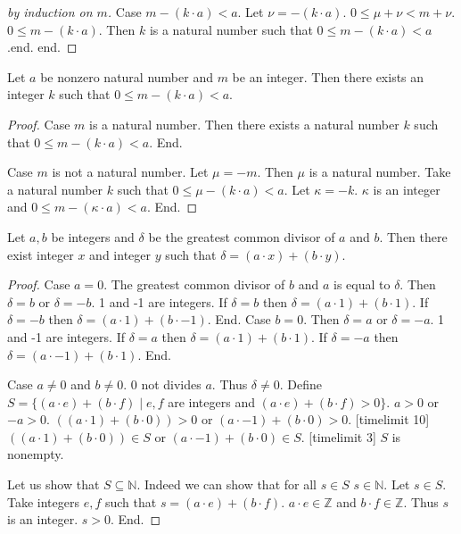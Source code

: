 \documentclass{article}
\begin{document}
\begin{forthel}
\begin{proof}[by induction on $m$]
Case $m - (k \cdot a) < a$. Let $\nu = -(k \cdot a)$.
$0 \leq \mu + \nu < m + \nu$. 
$0 \leq m - (k \cdot a)$.
Then $k$ is a natural number such that
$0 \leq  m - (k \cdot a) < a$.end.
end. 
\end{proof}

\begin{lemma}
Let $a$ be nonzero natural number and $m$ be an integer.
Then there exists an integer $k$ such that $0 \leq m - (k \cdot a) < a$.
\end{lemma}
\begin{proof}
Case $m$ is a natural number. Then there exists a natural number $k$ such that $0 \leq m - (k \cdot a) < a$. End.

Case $m$ is not a natural number. Let $\mu = -m$. Then $\mu$ is a natural number.
Take a natural number $k$ such that $0 \leq \mu - (k \cdot a) < a$. Let $\kappa = -k$. 
$\kappa$ is an integer and $0 \leq m - (\kappa \cdot a) < a$. End.
\end{proof}



\begin{theorem}[Bezout]
Let $a,b$ be integers and $\delta$ be the greatest common divisor of $a$ and $b$.
Then there exist integer $x$ and integer $y$ such that 
$\delta = (a \cdot x) + (b \cdot y)$. 
\end{theorem}
\begin{proof}
Case $a = 0$. The greatest common divisor of $b$ and $a$ is equal to $\delta$.
  Then $\delta = b$ or $\delta = -b$. 1 and -1 are integers. 
  If $\delta = b$ then $\delta = (a \cdot 1) + (b \cdot 1)$. If $\delta = -b$ then $\delta = (a \cdot 1) + (b \cdot -1)$. End. 
Case $b = 0$. Then $\delta = a$ or $\delta = -a$. 1 and -1 are integers. 
  If $\delta = a$ then $\delta = (a \cdot 1) + (b \cdot 1)$. If $\delta = -a$ then $\delta = (a \cdot -1) + (b \cdot 1)$. End. 

Case $a \neq  0$ and $b \neq 0$.
  $0$ not divides $a$. Thus $\delta \neq 0$.
  Define $S = \{ (a \cdot e) + (b \cdot f) \mid e,f$ are integers and 
  $(a \cdot e) + (b \cdot f) > 0\}$.
  $a > 0$ or $-a > 0$.
  $((a \cdot 1) + (b \cdot 0)) > 0$ or $(a \cdot -1) + (b \cdot 0) > 0$. 
  [timelimit 10] $((a \cdot 1) + (b \cdot 0)) \in S$ or $(a \cdot -1) + (b \cdot 0) \in S$. [timelimit 3]
  $S$ is nonempty.

  Let us show that $S \subseteq \mathbb{N}$.
    Indeed we can show that for all $s \in S$ $s \in \mathbb{N}$.
    Let $s \in S$.
    Take integers $e,f$ such that $s = (a \cdot e) + (b \cdot f)$. 
    $a \cdot e \in \mathbb{Z}$ and $b \cdot f \in \mathbb{Z}$. Thus $s$ is an integer.
    $s > 0$. 
  End.
    


\end{proof}
\end{forthel}
\end{document}
